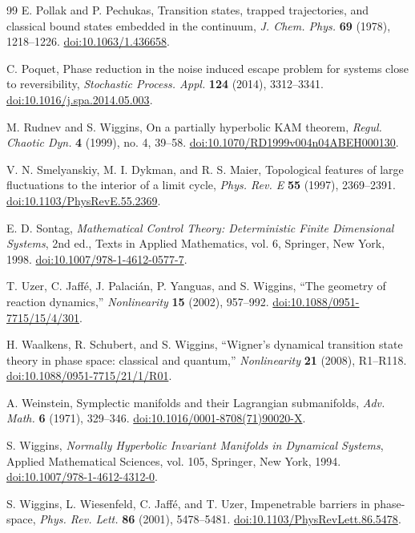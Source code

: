 \documentclass[11pt]{article}
\theoremstyle{definition}
\theoremstyle{remark}
\newcommand{\doi}[1]{\href{https://doi.org/#1}{doi:#1}}
\begin{document}
\begin{thebibliography}{99}
E. Pollak and P. Pechukas,
Transition states, trapped trajectories, and classical bound states embedded in the continuum,
\emph{J. Chem. Phys.} \textbf{69} (1978), 1218--1226.
\doi{10.1063/1.436658}.

C. Poquet,
Phase reduction in the noise induced escape problem for systems close to reversibility,
\emph{Stochastic Process. Appl.} \textbf{124} (2014), 3312--3341.
\doi{10.1016/j.spa.2014.05.003}.

M. Rudnev and S. Wiggins,
On a partially hyperbolic KAM theorem,
\emph{Regul. Chaotic Dyn.} \textbf{4} (1999), no. 4, 39--58.
\doi{10.1070/RD1999v004n04ABEH000130}.

V. N. Smelyanskiy, M. I. Dykman, and R. S. Maier,
Topological features of large fluctuations to the interior of a limit cycle,
\emph{Phys. Rev. E} \textbf{55} (1997), 2369--2391.
\doi{10.1103/PhysRevE.55.2369}.

E. D. Sontag,
\emph{Mathematical Control Theory: Deterministic Finite Dimensional Systems},
2nd ed., Texts in Applied Mathematics, vol. 6, Springer, New York, 1998.
\doi{10.1007/978-1-4612-0577-7}.

T. Uzer, C. Jaff\'e, J. Palaci\'an, P. Yanguas, and S. Wiggins,
``The geometry of reaction dynamics,''
\emph{Nonlinearity} \textbf{15} (2002), 957--992.
\doi{10.1088/0951-7715/15/4/301}.

H. Waalkens, R. Schubert, and S. Wiggins,
``Wigner's dynamical transition state theory in phase space: classical and quantum,''
\emph{Nonlinearity} \textbf{21} (2008), R1--R118.
\doi{10.1088/0951-7715/21/1/R01}.

A. Weinstein,
Symplectic manifolds and their Lagrangian submanifolds,
\emph{Adv. Math.} \textbf{6} (1971), 329--346.
\doi{10.1016/0001-8708(71)90020-X}.

S. Wiggins,
\emph{Normally Hyperbolic Invariant Manifolds in Dynamical Systems},
Applied Mathematical Sciences, vol. 105, Springer, New York, 1994.
\doi{10.1007/978-1-4612-4312-0}.

S. Wiggins, L. Wiesenfeld, C. Jaff\'e, and T. Uzer,
Impenetrable barriers in phase-space,
\emph{Phys. Rev. Lett.} \textbf{86} (2001), 5478--5481.
\doi{10.1103/PhysRevLett.86.5478}.

\end{thebibliography}
\end{document}
